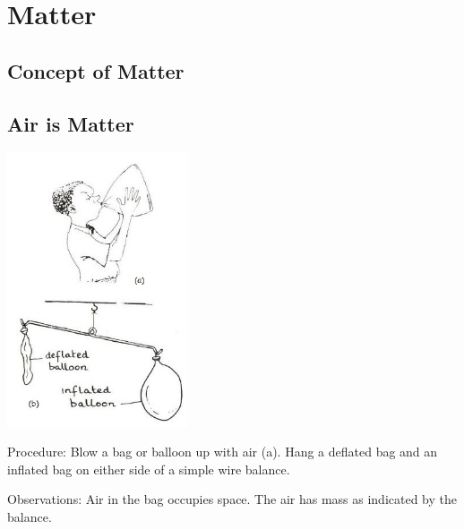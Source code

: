 \section{Matter}

\begin{multicols}{2}


\section*{Concept of Matter}


\subsection{Air is Matter}

\begin{center}
\includegraphics[width=0.4\textwidth]{./img/source/air-matter.jpg}
\end{center}

\begin{description*}
\item[Procedure:]{Blow a bag or balloon up with air (a). Hang a deflated bag and an inflated bag on either side of a simple wire balance.}
\item[Observations:]{Air in the bag occupies space. The air has mass as indicated by the balance.}
\end{description*}


\end{multicols}
